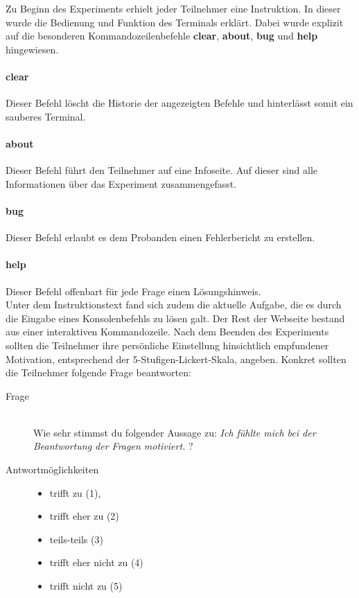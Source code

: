 Zu Beginn des Experiments erhielt jeder Teilnehmer eine Instruktion. In dieser wurde die Bedienung und Funktion des Terminals erklärt. Dabei wurde explizit auf die besonderen Kommandozeilenbefehle \textbf{clear}, \textbf{about}, \textbf{bug} und \textbf{help} hingewiesen.

\paragraph{clear}
Dieser Befehl löscht die Historie der angezeigten Befehle und hinterlässt somit ein sauberes Terminal.

\paragraph{about}
Dieser Befehl führt den Teilnehmer auf eine Infoseite. Auf dieser sind alle Informationen über das Experiment zusammengefasst.

\paragraph{bug}
Dieser Befehl erlaubt es dem Probanden einen Fehlerbericht zu erstellen.

\paragraph{help}
Dieser Befehl offenbart für jede Frage einen Lösungshinweis. \\

Unter dem Instruktionstext fand sich zudem die aktuelle Aufgabe, die es durch die Eingabe eines Konsolenbefehls zu lösen galt. Der Rest der Webseite bestand aus einer interaktiven Kommandozeile. Nach dem Beenden des Experiments sollten die Teilnehmer ihre persönliche Einstellung hinsichtlich empfundener Motivation, entsprechend der 5-Stufigen-Lickert-Skala, angeben. Konkret sollten die Teilnehmer folgende Frage beantworten:

\begin{description}
\item[Frage]\hfill \\ Wie sehr stimmst du folgender Aussage zu: \textit{Ich fühlte mich bei der Beantwortung der Fragen motiviert.} ?
\item[Antwortmöglichkeiten]\hfill 


\begin{itemize}
	 \item trifft zu (1),
	 \item trifft eher zu (2)
	 \item teils-teils (3)
	 \item trifft eher nicht zu (4)
	 \item trifft nicht zu (5)
\end{itemize}
\end{description}

